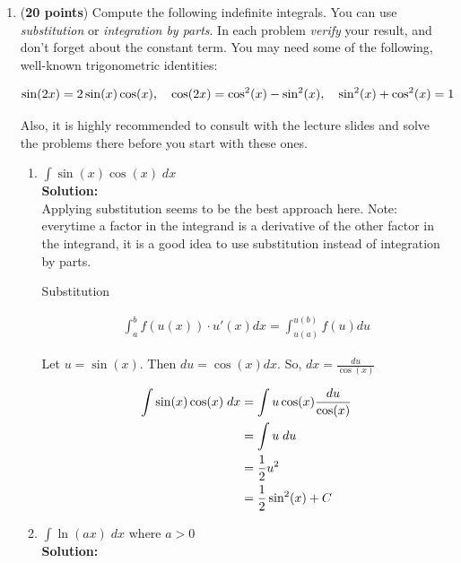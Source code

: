 \documentclass[a4paper]{article}
\begin{document}
\begin{enumerate}


\item (\textbf{20 points}) Compute the following indefinite integrals. You can use \textit{substitution} or \textit{integration by parts}. In each problem \textit{verify} your result, and don't forget about the constant term. You may need some of the following, well-known trigonometric identities:

\begin{align}
	\sin(2x) = 2\sin(x)\cos(x), \quad \cos(2x) = \cos^2(x) - \sin^2(x), \quad \sin^2(x) + \cos^2(x) = 1\notag
\end{align}

Also, it is highly recommended to consult with the lecture slides and solve the problems there before you start with these ones.

\begin{enumerate}
	\item $\int \sin(x) \cos(x) \; dx$\\
	\textbf{Solution:}\\

Applying substitution seems to be the best approach here. Note: everytime a factor in the integrand is a derivative of the other factor in the integrand, it is a good idea to use substitution instead of integration by parts.

Substitution

\begin{align*}
	\int_a^b f(u(x)) \cdot u'(x) dx = \int_{u(a)}^{u(b)} f(u) du
\end{align*}


Let $u = \sin(x)$. Then $du = \cos(x)dx$. So, $dx = \frac{du}{\cos(x)}$

\begin{align}
	\int \sin(x) \cos(x) \; dx &= \int u \cos(x) \frac{du}{\cos(x)}\notag\\
	&= \int u \; du\notag\\
	&= \frac{1}{2}u^2\notag\\
	&= \frac{1}{2} \sin^2(x) + C\notag
\end{align}	

	
	
	\item $\int \ln(ax) \; dx$ where $a > 0$\\
	\textbf{Solution:}\\
	

\end{enumerate}
\end{enumerate}
\end{document}
